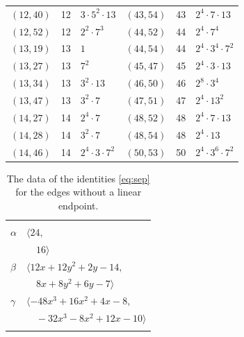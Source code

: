 \documentclass[11pt]{article}
\begin{document}
\begin{longtable}{@{}lrl@{\qquad}lrl@{}}
$(12,40)$ & 12 & $3\cdot 5^{2}\cdot 13$ & $(43,54)$ & 43 & $2^{4}\cdot 7\cdot 13$\\
$(12,52)$ & 12 & $2^{2}\cdot 7^{3}$ & $(44,52)$ & 44 & $2^{4}\cdot 7^{4}$\\
$(13,19)$ & 13 & $1$ & $(44,54)$ & 44 & $2^{4}\cdot 3^{4}\cdot 7^{2}$\\
$(13,27)$ & 13 & $7^{2}$ & $(45,47)$ & 45 & $2^{4}\cdot 3\cdot 13$\\
$(13,34)$ & 13 & $3^{2}\cdot 13$ & $(46,50)$ & 46 & $2^{8}\cdot 3^{4}$\\
$(13,47)$ & 13 & $3^{2}\cdot 7$ & $(47,51)$ & 47 & $2^{4}\cdot 13^{2}$\\
$(14,27)$ & 14 & $2^{4}\cdot 7$ & $(48,52)$ & 48 & $2^{4}\cdot 7\cdot 13$\\
$(14,28)$ & 14 & $3^{2}\cdot 7$ & $(48,54)$ & 48 & $2^{4}\cdot 13$\\
$(14,46)$ & 14 & $2^{4}\cdot 3\cdot 7^{2}$ & $(50,53)$ & 50 & $2^{4}\cdot 3^{6}\cdot 7^{2}$\\
\end{longtable}
\endgroup

\begingroup\scriptsize
\setlength{\LTcapwidth}{\textwidth}
\begin{longtable}{@{}ll@{}}
\caption{The data of the identities \eqref{eq:sep} for the edges without a linear endpoint.}\label{tab:bez}\\
\hline\endfirsthead\hline\endhead\hline\endfoot
\multicolumn{2}{@{}l}{$(i,j)=(18,41)$, $D_{ij}=\langle 7,0\rangle$}\\
$\alpha$ & $\langle 24,$\\
 & $\quad 16\rangle$\\
$\beta$ & $\langle 12x+12y^{2}+2y-14,$\\
 & $\quad 8x+8y^{2}+6y-7\rangle$\\
$\gamma$ & $\langle -48x^{3}+16x^{2}+4x-8,$\\
 & $\quad -32x^{3}-8x^{2}+12x-10\rangle$\\
\addlinespace[2pt]
\end{longtable}
\endgroup
\end{document}

